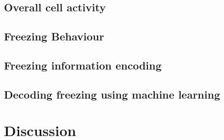 \subsection{Overall cell activity}
\subsection{Freezing Behaviour}
\subsection{Freezing information encoding}
\subsection{Decoding freezing using machine learning}
\section{Discussion}
